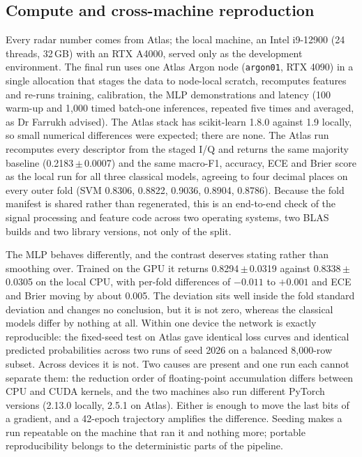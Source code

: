 \documentclass[conference]{IEEEtran}
\newcommand{\pmv}[2]{#1\,$\pm$\,#2}
\begin{document}
\subsection{Compute and cross-machine reproduction}
\label{sec:compute}
Every radar number comes from Atlas; the local machine, an Intel i9-12900 (24 threads, 32\,GB) with an RTX A4000, served only as the development environment. The final run uses one Atlas Argon node (\texttt{argon01}, RTX 4090) in a single allocation that stages the data to node-local scratch, recomputes features and re-runs training, calibration, the MLP demonstrations and latency (100 warm-up and 1,000 timed batch-one inferences, repeated five times and averaged, as Dr Farrukh advised). The Atlas stack has scikit-learn 1.8.0 against 1.9 locally, so small numerical differences were expected; there are none. The Atlas run recomputes every descriptor from the staged I/Q and returns the same majority baseline (\pmv{0.2183}{0.0007}) and the same macro-F1, accuracy, ECE and Brier score as the local run for all three classical models, agreeing to four decimal places on every outer fold (SVM 0.8306, 0.8822, 0.9036, 0.8904, 0.8786). Because the fold manifest is shared rather than regenerated, this is an end-to-end check of the signal processing and feature code across two operating systems, two BLAS builds and two library versions, not only of the split.

The MLP behaves differently, and the contrast deserves stating rather than smoothing over. Trained on the GPU it returns \pmv{0.8294}{0.0319} against \pmv{0.8338}{0.0305} on the local CPU, with per-fold differences of $-0.011$ to $+0.001$ and ECE and Brier moving by about 0.005. The deviation sits well inside the fold standard deviation and changes no conclusion, but it is not zero, whereas the classical models differ by nothing at all. Within one device the network is exactly reproducible: the fixed-seed test on Atlas gave identical loss curves and identical predicted probabilities across two runs of seed 2026 on a balanced 8,000-row subset. Across devices it is not. Two causes are present and one run each cannot separate them: the reduction order of floating-point accumulation differs between CPU and CUDA kernels, and the two machines also run different PyTorch versions (2.13.0 locally, 2.5.1 on Atlas). Either is enough to move the last bits of a gradient, and a 42-epoch trajectory amplifies the difference. Seeding makes a run repeatable on the machine that ran it and nothing more; portable reproducibility belongs to the deterministic parts of the pipeline. 
\end{document}
